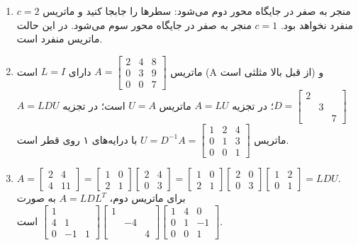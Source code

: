 \documentclass[12pt,a4paper]{article}
\begin{document}
{\begin{enumerate}
			\item $c=2$ منجر به صفر در جایگاه محور دوم می‌شود: سطرها را جابجا کنید و ماتریس منفرد نخواهد بود. $c=1$ منجر به صفر در جایگاه محور سوم می‌شود. در این حالت ماتریس منفرد است.
			
			\item ماتریس $A = \begin{bmatrix} 2 & 4 & 8 \\ 0 & 3 & 9 \\ 0 & 0 & 7 \end{bmatrix}$ دارای $L=I$ است (A از قبل بالا مثلثی است) و $D = \begin{bmatrix} 2 & & \\ & 3 & \\ & & 7 \end{bmatrix}$؛ در تجزیه $A=LU$ ماتریس $U=A$ است؛ در تجزیه $A=LDU$ ماتریس $U = D^{-1}A = \begin{bmatrix} 1 & 2 & 4 \\ 0 & 1 & 3 \\ 0 & 0 & 1 \end{bmatrix}$ با درایه‌های ۱ روی قطر است.
			
			\item $A = \begin{bmatrix} 2 & 4 \\ 4 & 11 \end{bmatrix} = \begin{bmatrix} 1 & 0 \\ 2 & 1 \end{bmatrix} \begin{bmatrix} 2 & 4 \\ 0 & 3 \end{bmatrix} = \begin{bmatrix} 1 & 0 \\ 2 & 1 \end{bmatrix} \begin{bmatrix} 2 & 0 \\ 0 & 3 \end{bmatrix} \begin{bmatrix} 1 & 2 \\ 0 & 1 \end{bmatrix} = LDU$.
			برای ماتریس دوم، $A=LDL^T$ به صورت $\begin{bmatrix} 1 & & \\ 4 & 1 & \\ 0 & -1 & 1 \end{bmatrix} \begin{bmatrix} 1 & & \\ & -4 & \\ & & 4 \end{bmatrix} \begin{bmatrix} 1 & 4 & 0 \\ 0 & 1 & -1 \\ 0 & 0 & 1 \end{bmatrix}$ است.
		\end{enumerate}
		
}
\end{document}

